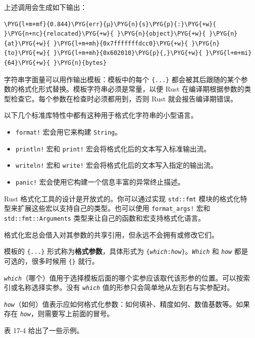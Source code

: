 上述调用会生成如下输出：

\begin{Verbatim}[commandchars=\\\{\},breaklines=true,breakanywhere=true,fontsize=\codefont,xleftmargin=17bp]
\PYG{l+m+mf}{0.844}\PYG{err}{μ}\PYG{n}{s}\PYG{p}{:}\PYG{+w}{ }\PYG{n+nc}{relocated}\PYG{+w}{ }\PYG{n}{object}\PYG{+w}{ }\PYG{n}{at}\PYG{+w}{ }\PYG{l+m+mh}{0x7fffffffdcc0}\PYG{+w}{ }\PYG{n}{to}\PYG{+w}{ }\PYG{l+m+mh}{0x602010}\PYG{p}{,}\PYG{+w}{ }\PYG{l+m+mi}{64}\PYG{+w}{ }\PYG{n}{bytes}
\end{Verbatim}

字符串字面量可以用作输出模板：模板中的每个 \texttt{\{...\}} 都会被其后跟随的某个参数的格式化形式替换。模板字符串必须是常量，以便 Rust 在编译期根据参数的类型检查它。每个参数在检查时必须都用到，否则 Rust 就会报告编译期错误。

以下几个标准库特性中都有这种用于格式化字符串的小型语言。

\begin{itemize}
\item \texttt{format!} 宏会用它来构建 \texttt{String}。
\item \texttt{println!} 宏和 \texttt{print!} 宏会将格式化后的文本写入标准输出流。
\item \texttt{writeln!} 宏和 \texttt{write!} 宏会将格式化后的文本写入指定的输出流。
\item \texttt{panic!} 宏会使用它构建一个信息丰富的异常终止描述。
\end{itemize}

Rust 格式化工具的设计是开放式的。你可以通过实现 \texttt{std::fmt} 模块的格式化特型来扩展这些宏以支持自己的类型。也可以使用 \texttt{format\_args!} 宏和 \texttt{std::fmt::Arguments} 类型来让自己的函数和宏支持格式化语言。

格式化宏总会借入对其参数的共享引用，但永远不会拥有或修改它们。

模板的 \texttt{\{...\}} 形式称为\textbf{格式参数}，具体形式为 \texttt{\{\emph{which}:\emph{how}\}}。\emph{\texttt{Which}} 和 \emph{\texttt{how}} 都是可选的，很多时候用 \texttt{\{\}} 就行。

\emph{\texttt{which}}（哪个）值用于选择模板后面的哪个实参应该取代该形参的位置。可以按索引或名称选择实参。没有 \emph{\texttt{which}} 值的形参只会简单地从左到右与实参配对。

\emph{\texttt{how}}（如何）值表示应如何格式化参数：如何填补、精度如何、数值基数等。如果存在 \emph{\texttt{how}}，则需要写上前面的冒号。

表 17-4 给出了一些示例。

